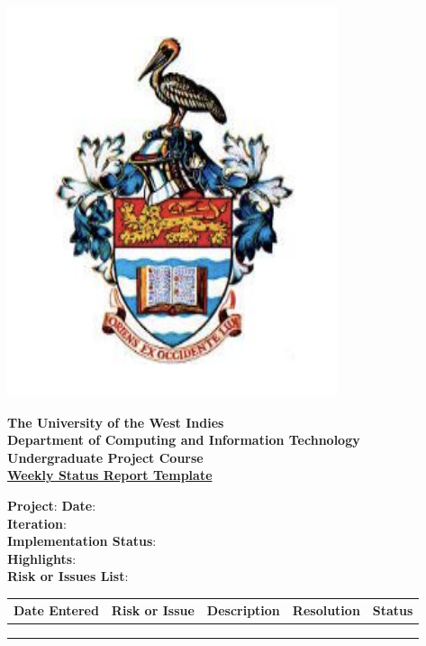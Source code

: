 \documentclass{article}
\begin{document}
\begin{center}

\includegraphics[scale=0.5]{logo.png}

\bf
The University of the West Indies \\[3ex]


Department of Computing and Information Technology \\[3ex] 

Undergraduate Project Course \\[3ex]

 
\underline{Weekly Status Report Template} \\[10ex]


\end{center}



\noindent\textbf{Project}: \hfill \textbf{Date}: \\

\noindent \textbf{Iteration}: \\ 

\noindent \textbf{Implementation Status}: \\ 

\noindent \textbf{Highlights}: \\ 

\noindent \textbf{Risk or Issues List}: \\

\begin{center}
    \begin{table}[!ht]
    \centering
\begin{tabular}{|l|l|l|l|l|}
\hline
Date Entered & Risk or Issue & Description & Resolution & Status \\ \hline
             &               &             &            &        \\ \hline
             &               &             &            &        \\ \hline
             &               &             &            &        \\ \hline
\end{tabular}
\end{table}
\end{center}
    
\end{document}
